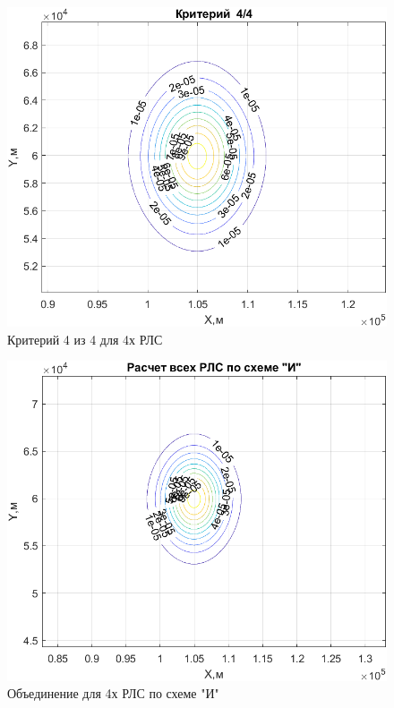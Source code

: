 \begin{figure}
    \centering
    \includegraphics{figures/4_4_RLS.png}
    \caption{Критерий 4 из 4 для 4х РЛС}
    \label{fig:my_label}
\end{figure}

\begin{figure}
    \centering
    \includegraphics{figures/AND_RLS_4.png}
    \caption{Объединение для 4х РЛС по схеме "И"}
    \label{fig:my_label}
\end{figure}


